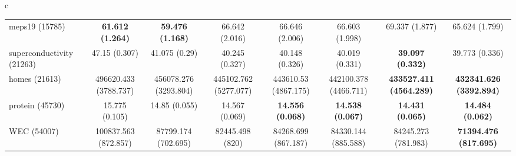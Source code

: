 \documentclass[border=6pt]{standalone}
\begin{document}
\begin{adjustbox}{max width=\linewidth}
\begin{tabular}{c}
\begin{tabular}{lccccccc}
meps19 (15785) & \textbf{61.612 (1.264)} & \textbf{59.476 (1.168)} & 66.642 (2.016) & 66.646 (2.006) & 66.603 (1.998) & 69.337 (1.877) & 65.624 (1.799)\\
superconductivity (21263) & 47.15 (0.307) & 41.075 (0.29) & 40.245 (0.327) & 40.148 (0.326) & 40.019 (0.331) & \textbf{39.097 (0.332)} & 39.773 (0.336)\\
homes (21613) & 496620.433 (3788.737) & 456078.276 (3293.804) & 445102.762 (5277.077) & 443610.53 (4867.175) & 442100.378 (4466.711) & \textbf{433527.411 (4564.289)} & \textbf{432341.626 (3392.894)}\\
protein (45730) & 15.775 (0.105) & 14.85 (0.055) & 14.567 (0.069) & \textbf{14.556 (0.068)} & \textbf{14.538 (0.067)} & \textbf{14.431 (0.065)} & \textbf{14.484 (0.062)}\\
WEC (54007) & 100837.563 (872.857) & 87799.174 (702.695) & 82445.498 (820) & 84268.699 (867.187) & 84330.144 (885.588) & 84245.273 (781.983) & \textbf{71394.476 (817.695)}\\
\hline
\end{tabular}
\end{tabular}
\end{adjustbox}
\end{document}
